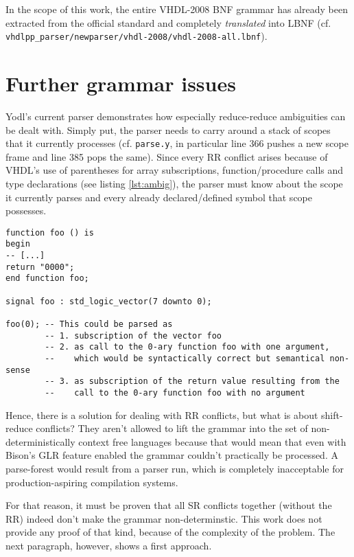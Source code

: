 In the scope of this work, the entire VHDL-2008 BNF grammar has
already been
extracted from the official standard and completely \emph{translated}
into LBNF
(cf. \texttt{vhdlpp_parser/\-newparser/\-vhdl-2008/\-vhdl-2008-all.lbnf}).
%
%
%
\section{Further grammar issues}
Yodl's current parser demonstrates how
especially reduce-reduce ambiguities can be dealt with. Simply put,
the parser needs to carry around a stack of scopes that it currently
processes (cf. \texttt{parse.y}, in particular line 366 pushes a new
scope frame and line 385 pops the same). Since every RR conflict
arises because of VHDL's use of
parentheses for array subscriptions, function/procedure calls and type
declarations (see listing \ref{lst:ambig}), the parser must know about
the scope it currently parses and every already declared/defined
symbol that scope possesses.
%
\begin{lstlisting}[style=vhdl, caption={Illustration of a common
      reduce-reduce conflict}, label={lst:ambig}]
function foo () is
begin
-- [...]
return "0000";
end function foo;

signal foo : std_logic_vector(7 downto 0);

foo(0); -- This could be parsed as
        -- 1. subscription of the vector foo
        -- 2. as call to the 0-ary function foo with one argument,
        --    which would be syntactically correct but semantical non-sense
        -- 3. as subscription of the return value resulting from the
        --    call to the 0-ary function foo with no argument
\end{lstlisting}
%
Hence, there is a solution for dealing with RR conflicts, but
what is about shift-reduce conflicts? They aren't allowed to lift the
grammar into the set of non-deterministically context free languages
because that would mean that even with Bison's GLR feature enabled %
the grammar couldn't practically be processed. A parse-forest would
result from a parser run, which is completely inacceptable for
production-aspiring compilation systems.

For that reason, it must be proven that all SR conflicts together
(without the RR) indeed don't make the grammar non-determinstic.
This work does not provide any proof of that kind, because of the
complexity of the problem. The next paragraph, however, shows a first
approach.

